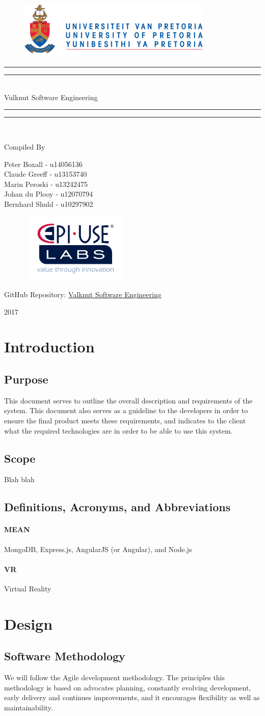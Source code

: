 \documentclass{article}
\newcommand*{\titleGP}{\begingroup
		\begin{figure}[t]
			\centering
			\includegraphics[width=350px]{UP_Logo.PNG}
		\end{figure}		
\centering 
\vspace*{\baselineskip}

\rule{\textwidth}{1.6pt}\vspace*{-\baselineskip}\vspace*{2pt}
\rule{\textwidth}{0.4pt}\\[\baselineskip]

{\Huge Vulknut Software Engineering } \\ [0.2\baselineskip]
\rule{\textwidth}{0.4pt}\vspace*{-\baselineskip}\vspace{3.2pt}
\rule{\textwidth}{1.6pt}\\[\baselineskip] %



\bigskip

Compiled By \\[\baselineskip]

\bigskip

{\Large Peter Boxall - u14056136 \\ Claude Greeff - u13153740 \\ Marin Peroski -  u13242475 \\ Johan du Plooy - u12070794 \\ Bernhard Shuld - u10297902 \\\par}

\bigskip
\bigskip
 
	\begin{figure}[H]
			\centering
			\includegraphics[width=200px,height=125px]{epiUse.PNG}
	\end{figure}

\bigskip
\bigskip
 
 	{\huge GitHub Repository:  
 	\href{https://github.com/Valknut-Software-Engineering/Capstone_Project}{Valknut Software Engineering}\par}
	
\vfill

{\Large 2017} \\[0.3\baselineskip]

\endgroup}
\begin{document}
\titleGP
\newpage
\tableofcontents
\newpage

\section{Introduction}

	\subsection{Purpose}
	This document serves to outline the overall description and requirements of 	the system. This document also serves as a guideline to the developers in 		order to ensure the final product meets these requirements, and indicates 		to the client what the required technologies are in order to be able to use 	this system.
	
	\subsection{Scope}
	
	Blah blah	
	
	\subsection{Definitions, Acronyms, and Abbreviations}
			\paragraph{MEAN}	MongoDB, Express.js, AngularJS (or Angular), and Node.js
			\paragraph{VR}	Virtual Reality

\section{Design}

	\subsection{Software Methodology}
	We will follow the Agile development methodology. The principles this methodology is based on advocates planning, constantly evolving development, early delivery and continues improvements, and it encourages flexibility as well as maintainability.
	
\end{document}

